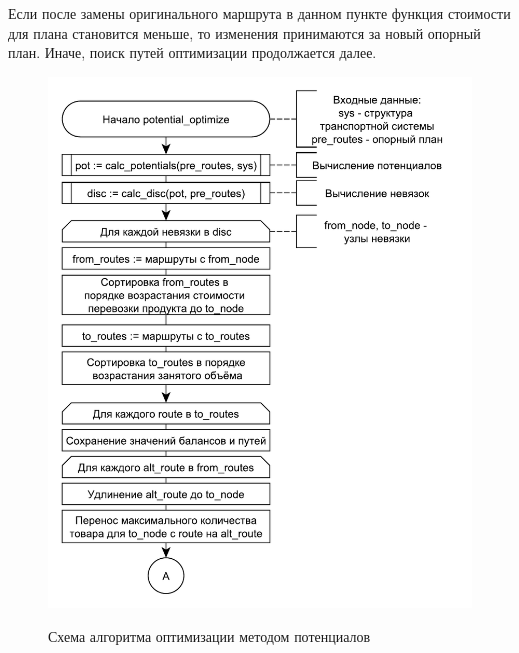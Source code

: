 Если после замены оригинального маршрута в данном пункте функция стоимости для плана становится меньше, то изменения принимаются за новый опорный план. Иначе, поиск путей оптимизации продолжается далее.

\begin{figure}[h]
	\begin{center}
		{\includegraphics[scale=0.8, angle=0, page=1]{img/potential_optimize_1.pdf}}
		\caption{Схема алгоритма оптимизации методом потенциалов}
		\label{alg:potential_1}
	\end{center}
\end{figure}

